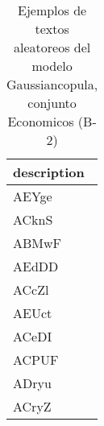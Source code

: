 \begin{table}[H]
\centering
\fontsize{8}{14}\selectfont
\caption{Ejemplos de textos aleatoreos del modelo Gaussiancopula, conjunto Economicos (B-2)}
\label{table-sample10-economicos-b-2-gaussiancopula-text}
\begin{tabular}{|m{50em}|}
\hline
\rowcolor[gray]{0.8}
description \\
\hline AEYge \\
\hline ACknS \\
\hline ABMwF \\
\hline AEdDD \\
\hline ACcZl \\
\hline AEUct \\
\hline ACeDI \\
\hline ACPUF \\
\hline ADryu \\
\hline ACryZ \\
\hline
\end{tabular}
\end{table}
